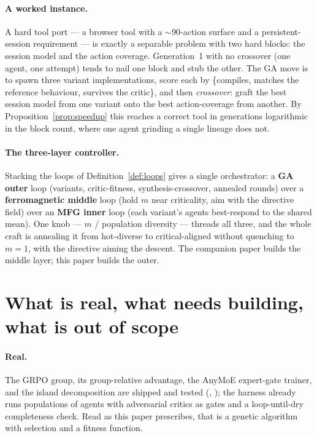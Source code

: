 \documentclass[11pt]{article}
\begin{document}
\paragraph{A worked instance.} A hard tool port --- a browser tool with a $\sim$90-action surface and a
persistent-session requirement --- is exactly a separable problem with two hard blocks: the session model and
the action coverage. Generation~1 with no crossover (one agent, one attempt) tends to nail one block and stub
the other. The GA move is to spawn three variant implementations, score each by \{compiles, matches the
reference behaviour, survives the critic\}, and then \emph{crossover}: graft the best session model from one
variant onto the best action-coverage from another. By Proposition~\ref{prop:speedup} this reaches a correct
tool in generations logarithmic in the block count, where one agent grinding a single lineage does not.

\paragraph{The three-layer controller.} Stacking the loops of Definition~\ref{def:loops} gives a single
orchestrator: a \textbf{GA outer} loop (variants, critic-fitness, synthesis-crossover, annealed rounds) over a
\textbf{ferromagnetic middle} loop (hold $m$ near criticality, aim with the directive field) over an
\textbf{MFG inner} loop (each variant's agents best-respond to the shared mean). One knob --- $m$ / population
diversity --- threads all three, and the whole craft is annealing it from hot-diverse to critical-aligned
without quenching to $m=1$, with the directive aiming the descent. The companion paper builds the middle
layer; this paper builds the outer.

\section{What is real, what needs building, what is out of scope}
\label{sec:status}

\paragraph{Real.} The GRPO group, its group-relative advantage, the AnyMoE expert-gate trainer, and the
island decomposition are shipped and tested (\cite{hanzo-native-training}, \cite{hanzo-intrinsic-islands}); the
harness already runs populations of agents with adversarial critics as gates and a loop-until-dry completeness
check. Read as this paper prescribes, that is a genetic algorithm with selection and a fitness function.
\end{document}
